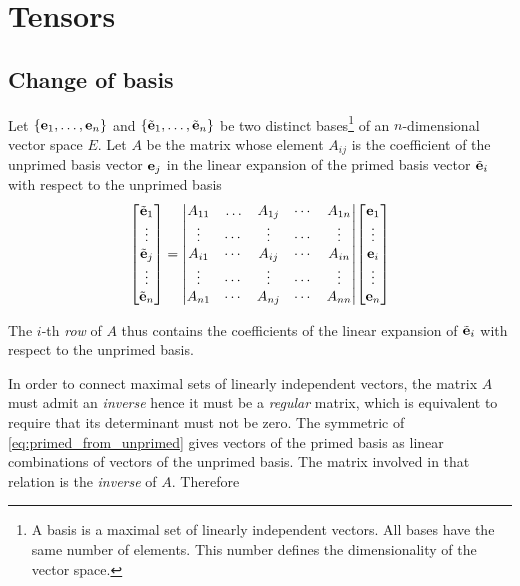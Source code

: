\appendix
\chapter{Tensors}
\label{ch:Tensors} 

\section{Change of basis}
Let $\{\vb{e}_1, \ldots, \vb{e}_n \}$ and $\{\tilde{\vb{e}}_1, \ldots, \tilde{\vb{e}}_n \}$ be two distinct bases\footnote{A basis is a maximal set of linearly independent vectors. All bases have the same number of elements. This number defines the dimensionality of the vector space.} of an $n$-dimensional vector space $E$.  
Let $A$ be the matrix whose element $A_{ij}$ is the coefficient of the unprimed basis vector $\vb{e}_j$ in the linear expansion of the primed basis vector $\tilde{\vb{e}}_i$ with respect to the unprimed basis    
\begin{align}
\label{eq:primed_from_unprimed}
\mqty[ \tilde{\vb{e}}_1 \\ \vdots \\ \tilde{\vb{e}}_j \\ \vdots \\ \tilde{\vb{e}}_n ] = \mqty|
A_{11}  &  \ldots  & A_{1j}  &  \cdots  & A_{1n} \\
\vdots  &  \cdots  & \vdots  &  \cdots  & \vdots \\
A_{i1}  &  \cdots  & A_{ij}  &  \cdots  & A_{in} \\
\vdots  &  \cdots  & \vdots  &  \cdots  & \vdots \\
A_{n1}  &  \cdots  & A_{nj}  &  \cdots  & A_{nn} |
\mqty[ \vb{e}_1 \\ \vdots \\ \vb{e}_i \\ \vdots \\ \vb{e}_n ]  
\end{align}

The $i$-th \textit{row} of $A$ thus contains the coefficients of the linear expansion of $\tilde{\vb{e}}_i$ with respect to the unprimed basis. 

In order to connect maximal sets of linearly independent vectors, the matrix $A$ must admit an \textit{inverse} hence it must be a \textit{regular} matrix, which is equivalent to require that its determinant must not be zero. The symmetric of \ref{eq:primed_from_unprimed} gives vectors of the primed basis as linear combinations of vectors of the unprimed basis. The matrix involved in that relation is the \textit{inverse} of $A$. Therefore

